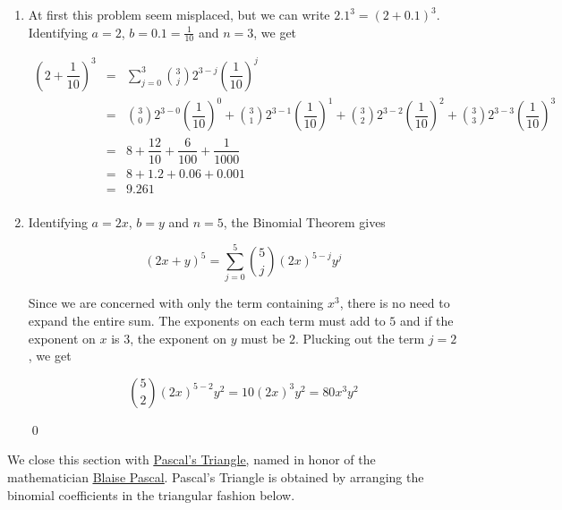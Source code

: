 \begin{ex}
\begin{enumerate}
\item  At first this problem seem misplaced, but we can write $2.1^{3} = (2 + 0.1)^3$.  Identifying $a =2$, $b = 0.1 = \frac{1}{10}$ and $n=3$, we get

\[ \begin{array}{rcl}

\left(2+\dfrac{1}{10} \right)^3 & = & \displaystyle{\sum_{j=0}^{3} \binom{3}{j} 2^{3-j} \left(\dfrac{1}{10}\right)^{j}} \\ [15pt]
        & = & \displaystyle{\binom{3}{0} 2^{3-0} \left(\dfrac{1}{10}\right)^{0} + \binom{3}{1} 2^{3-1} \left(\dfrac{1}{10}\right)^{1} + \binom{3}{2} 2^{3-2} \left(\dfrac{1}{10}\right)^{2} + \binom{3}{3} 2^{3-3} \left(\dfrac{1}{10}\right)^{3}} \\ [15pt]
        & = & 8 + \dfrac{12}{10} + \dfrac{6}{100} + \dfrac{1}{1000} \\ [15pt]
        & = & 8 + 1.2 + 0.06 + 0.001 \\
        & = & 9.261 \\
\end{array} \]

\item  Identifying $a = 2x$, $b = y$ and $n=5$, the Binomial Theorem gives 

\[ (2x+y)^{5} = \displaystyle{\sum_{j=0}^{5} \binom{5}{j} (2x)^{5-j} y^{j}} \]

Since we are concerned with only the term containing $x^3$, there is no need to expand the entire sum.  The exponents on each term must add to $5$ and if the exponent on $x$ is $3$, the exponent on $y$ must be $2$.  Plucking out the term $j=2$, we get

\[  \displaystyle{\binom{5}{2} (2x)^{5-2} y^{2}} = 10 (2x)^3y^2 = 80x^3y^2 \]

\qed


\end{enumerate}
\end{ex}

We close this section with  \href{http://en.wikipedia.org/wiki/Pascal's_triangle}{\underline{Pascal's Triangle}}, named in honor of the mathematician \href{http://en.wikipedia.org/wiki/Blaise_Pascal}{\underline{Blaise Pascal}}.  Pascal's Triangle is obtained by arranging the binomial coefficients in the triangular fashion below.

